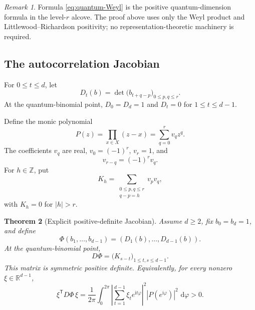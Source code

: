 \documentclass[11pt]{amsart}
\newtheorem{theorem}{Theorem}[section]
\theoremstyle{definition}
\theoremstyle{remark}
\newtheorem{remark}[theorem]{Remark}
\newcommand{\R}{\mathbb R}
\newcommand{\Z}{\mathbb Z}
\newcommand{\dd}{\,\mathrm d}
\begin{document}
\begin{remark}\label{rem:quantum-dimension}
Formula \eqref{eq:quantum-Weyl} is the positive quantum-dimension formula in the level-$r$ alcove.  The proof above uses only the Weyl product and Littlewood--Richardson positivity; no representation-theoretic machinery is required.
\end{remark}

\subsection{The autocorrelation Jacobian}

For $0\le t\le d$, let
\begin{equation}\label{eq:Dt-band}
 D_t(b)=\det\bigl(b_{t+q-p}\bigr)_{0\le p,q\le r}.
\end{equation}
At the quantum-binomial point, $D_0=D_d=1$ and $D_t=0$ for $1\le t\le d-1$.

Define the monic polynomial
\begin{equation}\label{eq:P-recurrence}
 P(z)=\prod_{x\in X}(z-x)=\sum_{q=0}^r v_qz^q.
\end{equation}
The coefficients $v_q$ are real, $v_0=(-1)^r$, $v_r=1$, and
\begin{equation}\label{eq:v-palindrome}
 v_{r-q}=(-1)^rv_q.
\end{equation}
For $h\in\Z$, put
\begin{equation}\label{eq:Kh}
 K_h=\sum_{\substack{0\le p,q\le r\\q-p=h}}v_pv_q,
\end{equation}
with $K_h=0$ for $|h|>r$.

\begin{theorem}[Explicit positive-definite Jacobian]\label{thm:q-Jacobian}
Assume $d\ge2$, fix $b_0=b_d=1$, and define
\[
 \Phi(b_1,\ldots,b_{d-1})=(D_1(b),\ldots,D_{d-1}(b)).
\]
At the quantum-binomial point,
\begin{equation}\label{eq:q-Jacobian}
 D\Phi=\bigl(K_{s-t}\bigr)_{1\le t,s\le d-1}.
\end{equation}
This matrix is symmetric positive definite.  Equivalently, for every nonzero $\xi\in\R^{d-1}$,
\begin{equation}\label{eq:q-Jacobian-integral}
 \xi^{\mathsf T}D\Phi\,\xi
 =\frac1{2\pi}\int_0^{2\pi}
 \left|\sum_{t=1}^{d-1}\xi_te^{\mathrm it\varphi}\right|^2
 |P(e^{\mathrm i\varphi})|^2\,\dd\varphi>0.
\end{equation}
\end{theorem}
\end{document}
